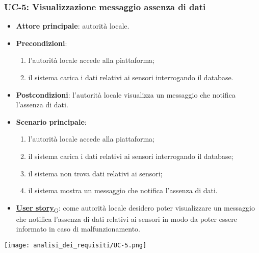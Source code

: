 
\subsubsection{UC-5: Visualizzazione messaggio assenza di dati}
\begin{itemize}
	\item \textbf{Attore principale}: autorità locale.
	\item \textbf{Precondizioni}:
	      \begin{enumerate}
		      \item l'autorità locale accede alla piattaforma;
		      \item il sistema carica i dati relativi ai sensori interrogando il database.
	      \end{enumerate}
	\item \textbf{Postcondizioni}: l'autorità locale visualizza un messaggio che notifica l'assenza di dati.
	\item \textbf{Scenario principale}:
	      \begin{enumerate}
		      \item l'autorità locale accede alla piattaforma;
		      \item il sistema carica i dati relativi ai sensori interrogando il database;
		      \item il sistema non trova dati relativi ai sensori;
		      \item il sistema mostra un messaggio che notifica l'assenza di dati.
	      \end{enumerate}
	\item \href{https://7last.github.io/docs/pb/documentazione-interna/glossario\#user-story}{\textbf{User story}\textsubscript{G}}:
	      come autorità locale desidero poter visualizzare un messaggio che notifica l'assenza di dati relativi ai sensori
	      in modo da poter essere informato in caso di malfunzionamento.
\end{itemize}
\begin{center}
	\texttt{[image: analisi\_dei\_requisiti/UC-5.png]}
\end{center}

